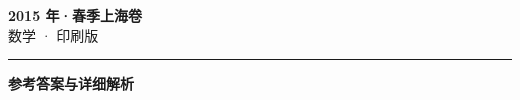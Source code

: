 \documentclass[zihao=5, a4paper]{ctexart}
\begin{document}
\begin{center}
  {\Large\bfseries 2015 年·春季上海卷}\\[4pt]
  {\large 数学 · 印刷版}
\end{center}
\medskip
{}

\par\bigskip\hrule\bigskip
{}
\begin{center}{\large\bfseries 参考答案与详细解析}\end{center}
\smallskip

\end{document}
